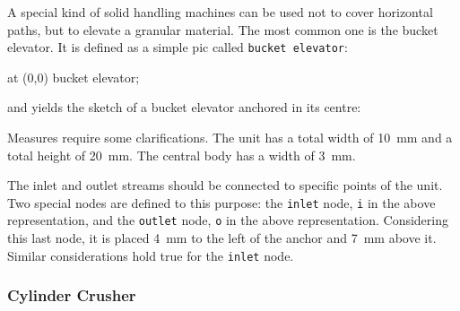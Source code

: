 \documentclass[12pt]{article}						%
\newcommand*{\chpn}[1]{\texttt{#1}}				%
\newcommand*{\chpp}[1]{\texttt{#1}}				%
\begin{document}
A special kind of solid handling machines can be used not to cover horizontal
paths, but to elevate a granular material. The most common one is the bucket
elevator. It is defined as a simple pic called \chpp{bucket elevator}:
\begin{chpcode}
	\pic at (0,0) {bucket elevator};
\end{chpcode}
and yields the sketch of a bucket elevator anchored in its centre:
\begin{center}
\end{center}

Measures require some clarifications. The unit has a total width of \SI{10}{\mm}
and a total height of \SI{20}{\mm}. The central body has a width of \SI{3}{\mm}.

The inlet and outlet streams should be connected to specific points of the unit.
Two special nodes are defined to this purpose:  the \chpn{inlet} node, \chpn{i}
in the above representation, and the \chpn{outlet} node, \chpn{o} in the above
representation. Considering this last node, it is placed \SI{4}{\mm} to the left
of the anchor and \SI{7}{\mm} above it. Similar considerations hold true for the
\chpn{inlet} node.

\subsubsection{Cylinder Crusher}
\end{document}
